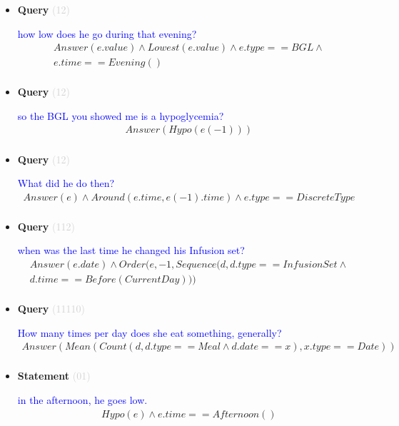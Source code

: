\documentclass[11pt]{article}
\newcommand{\key}[1]{\textcolor{lightgray}{#1}}
\newcounter{CQuery}
\newcounter{CStatement}
\begin{document}
\begin{itemize}
\item
\textbf{Query\theCQuery} \key{(12)} \addtocounter{CQuery}{1}
\textcolor{blue}{ how low does he go during that evening? }
\begin{multline*}
Answer(e.value) \wedge Lowest(e.value) \wedge e.type==BGL \wedge \\ 
e.time==Evening() \\ 
\end{multline*}


\item
\textbf{Query\theCQuery} \key{(12)} \addtocounter{CQuery}{1}
\textcolor{blue}{ so the BGL you showed me is a hypoglycemia? }
\begin{multline*}
Answer(Hypo(e(-1))) \\ 
\end{multline*}


\item
\textbf{Query\theCQuery} \key{(12)} \addtocounter{CQuery}{1}
\textcolor{blue}{ What did he do then? }
\begin{multline*}
Answer(e) \wedge Around(e.time, e(-1).time) \wedge e.type==DiscreteType \\ 
\end{multline*}


\item
\textbf{Query\theCQuery} \key{(112)} \addtocounter{CQuery}{1}
\textcolor{blue}{ when was the last time he changed his Infusion set? }
\begin{multline*}
Answer(e.date) \wedge Order(e, -1, Sequence(d, d.type==InfusionSet\wedge \\ 
d.time==Before(CurrentDay))) \\ 
\end{multline*}


\item
\textbf{Query\theCQuery} \key{(11110)} \addtocounter{CQuery}{1}
\textcolor{blue}{ How many times per day does she eat something, generally? }
\begin{multline*}
Answer(Mean(Count(d, d.type==Meal \wedge d.date==x), x.type==Date)) \\ 
\end{multline*}


\item
\textbf{Statement\theCStatement} \key{(01)} \addtocounter{CStatement}{1}
\textcolor{blue}{ in the afternoon, he goes low. }
\begin{multline*}
Hypo(e) \wedge e.time==Afternoon() \\ 
\end{multline*}



\end{itemize}
\end{document}
